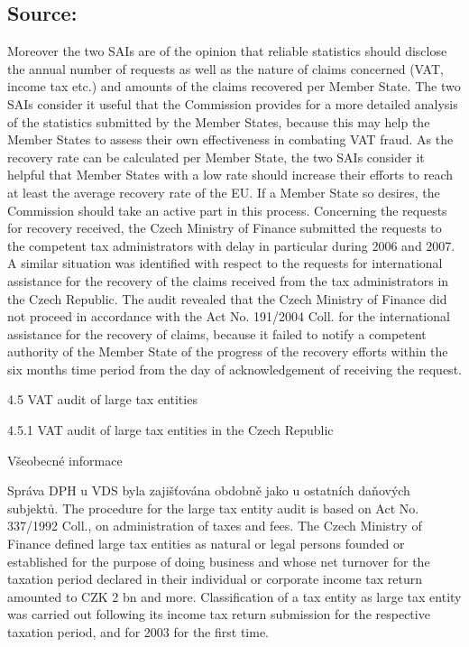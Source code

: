 \documentclass[10pt]{article}
\begin{document}
\subsection*{Source:}

Moreover the two SAIs are of the opinion that reliable statistics should disclose the annual number of requests as well as the nature of claims concerned (VAT, income tax etc.) and amounts of the claims recovered per Member State.
The two SAIs consider it useful that the Commission provides for a more detailed analysis of the statistics submitted by the Member States, because this may help the Member States to assess their own effectiveness in combating VAT fraud.
As the recovery rate can be calculated per Member State, the two SAIs consider it helpful that Member States with a low rate should increase their efforts to reach at least the average recovery rate of the EU.
If a Member State so desires, the Commission should take an active part in this process.
Concerning the requests for recovery received, the Czech Ministry of Finance submitted the requests to the competent tax administrators with delay in particular during 2006 and 2007.
A similar situation was identified with respect to the requests for international assistance for the recovery of the claims received from the tax administrators in the Czech Republic.
The audit revealed that the Czech Ministry of Finance did not proceed in accordance with the Act No. 191/2004 Coll. for the international assistance for the recovery of claims, because it failed to notify a competent authority of the Member State of the progress of the recovery efforts within the six months time period from the day of acknowledgement of receiving the request.


4.5 VAT audit of large tax entities



4.5.1 VAT audit of large tax entities in the Czech Republic



Všeobecné informace

Správa DPH u VDS byla zajišťována obdobně jako u ostatních daňových subjektů.
The procedure for the large tax entity audit is based on Act No. 337/1992 Coll., on administration of taxes and fees.
The Czech Ministry of Finance defined large tax entities as natural or legal persons founded or established for the purpose of doing business and whose net turnover for the taxation period declared in their individual or corporate income tax return amounted to CZK 2 bn and more.
Classification of a tax entity as large tax entity was carried out following its income tax return submission for the respective taxation period, and for 2003 for the first time.
\end{document}
